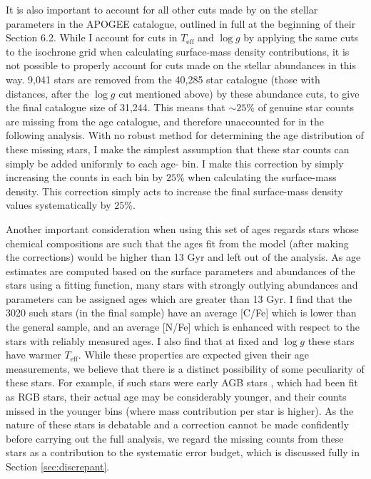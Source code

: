  It is also important to account for all other cuts made by \citet{2016MNRAS.456.3655M} on the stellar parameters in the APOGEE catalogue, outlined in full at the beginning of their Section 6.2. While I account for cuts in $T_{\mathrm{eff}}$ and $\log{g}$ by applying the same cuts to the isochrone grid when calculating surface-mass density contributions, it is not possible to properly account for cuts made on the stellar abundances in this way. 9,041 stars are removed from the 40,285 star catalogue (those with distances, after the $\log{g}$ cut mentioned above) by these abundance cuts, to give the final catalogue size of 31,244. This means that $\sim 25\%$ of genuine star counts are missing from the age catalogue, and therefore unaccounted for in the following analysis. With no robust method for determining the age distribution of these missing stars, I make the simplest assumption that these star counts can simply be added uniformly to each age-\feh{} bin. I make this correction by simply increasing the counts in each bin by $25\%$ when calculating the surface-mass density. This correction simply acts to increase the final surface-mass density values systematically by $25\%$.

Another important consideration when using this set of ages regards stars whose chemical compositions are such that the ages fit from the model (after making the corrections) would be higher than 13 Gyr and left out of the analysis. As age estimates are computed based on the surface parameters and abundances of the stars using a fitting function, many stars with strongly outlying abundances and parameters can be assigned ages which are greater than 13 Gyr. I find that the 3020 such stars (in the final sample) have an average [C/Fe] which is lower than the general sample, and an average [N/Fe] which is enhanced with respect to the stars with reliably measured ages. I also find that at fixed \feh{} and $\log{g}$ these stars have warmer $T_{\mathrm{eff}}$. While these properties are expected given their age measurements, we believe that there is a distinct possibility of some peculiarity of these stars. For example, if such stars were early AGB stars \citep[having gone through the second dredge-up, reducing the surface C abundance, e.g.][]{1999ApJ...510..232B}, which had been fit as RGB stars, their actual age may be considerably younger, and their counts missed in the younger bins (where mass contribution per star is higher). As the nature of these stars is debatable and a correction cannot be made confidently before carrying out the full analysis, we regard the missing counts from these stars as a contribution to the systematic error budget, which is discussed fully in Section \ref{sec:discrepant}.

